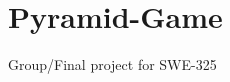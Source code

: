 \chapter{Pyramid-\/\+Game}
\hypertarget{md__pyramid-_game_2_r_e_a_d_m_e}{}\label{md__pyramid-_game_2_r_e_a_d_m_e}
\label{md__pyramid-_game_2_r_e_a_d_m_e_autotoc_md0}%
%


Group/\+Final project for SWE-\/325 